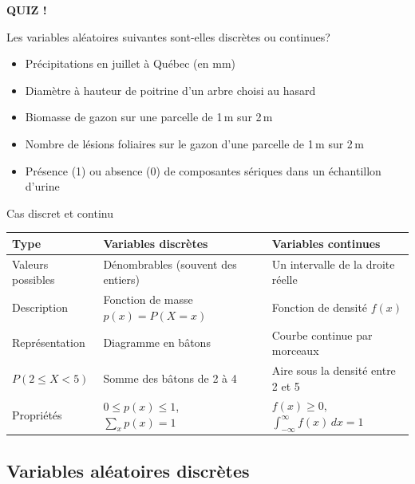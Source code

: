 \documentclass{BeamerTemplate}
\begin{document}
\begin{frame}[plain,t]
  \centerline{\LARGE\bfseries\alert{QUIZ !}}

  \medskip
  Les variables aléatoires suivantes sont-elles discrètes ou continues?
  \begin{itemize}\itemsep 3mm
    \item Précipitations en juillet à Québec (en mm)
    \item Diamètre à hauteur de poitrine d'un arbre choisi au hasard
    \item Biomasse de gazon sur une parcelle de 1\,m sur 2\,m
    \item Nombre de lésions foliaires sur le gazon d'une parcelle de 1\,m sur 2\,m
    \item Présence (1) ou absence (0) de composantes sériques dans un
      échantillon d'urine
  \end{itemize}
\end{frame}

\begin{frame}[t]{Cas discret et continu}
  \renewcommand{\arraystretch}{1.5}
  \small
  \begin{tabularx}{\textwidth}{@{}l|X|X@{}}
    \toprule
    \textbf{Type} & \textbf{Variables discrètes} & \textbf{Variables continues} \\
    \midrule
    Valeurs possibles & Dénombrables (souvent des entiers) & Un intervalle de la droite réelle \\
    Description & Fonction de masse $p(x) = P(X = x)$ & Fonction de densité $f(x)$ \\
    Représentation & Diagramme en bâtons & Courbe continue par morceaux \\
    $P(2 \le X < 5)$ & Somme des bâtons de 2 à 4 & Aire sous la densité entre 2 et 5 \\
    Propriétés & $0 \le p(x) \le 1$, \ $\displaystyle\sum_x p(x) = 1$
               & $f(x) \ge 0$, \ $\displaystyle\int_{-\infty}^{\infty} f(x)\,dx = 1$ \\
    \bottomrule
  \end{tabularx}
\end{frame}

\subsection{Variables aléatoires discrètes}
\end{document}
